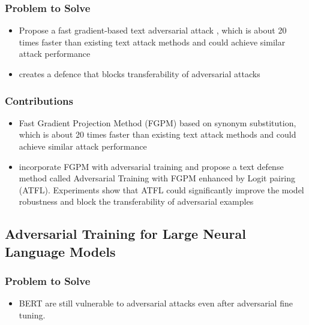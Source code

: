 \documentclass{article}
\begin{document}
\begin{flushleft}


 
\subsubsection*{Problem to Solve}
\begin{itemize}
    \item Propose a fast gradient-based text adversarial attack , which is about 20 times faster than existing text attack methods and could achieve similar attack performance
    \item creates a defence that blocks transferability of adversarial attacks
\end{itemize}

\subsubsection*{Contributions}
\begin{itemize}
  \item Fast Gradient Projection Method (FGPM) based on synonym substitution, which is about 20 times faster than existing text attack methods and could achieve similar attack performance
  \item incorporate FGPM with adversarial training and propose a text defense method called Adversarial Training with FGPM enhanced by Logit pairing (ATFL). Experiments show that ATFL could significantly improve the model robustness and block the transferability of adversarial examples
\end{itemize}










 
 



\subsection{ Adversarial Training for Large Neural Language Models \cite{liu2020adversarial}} 
\subsubsection*{Problem to Solve}
\begin{itemize}
    \item BERT are still vulnerable to adversarial attacks even after adversarial fine tuning.
\end{itemize}


\end{flushleft}
\end{document}
